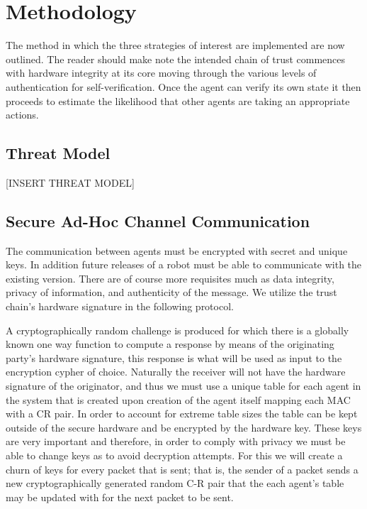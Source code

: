 \documentclass[conference]{IEEEtran}
\begin{document}
\section{Methodology}

The method in which the three strategies of interest are implemented are now outlined. The reader should make note the intended chain of trust commences with hardware integrity at its core moving through the various levels of authentication for self-verification. 
Once the agent can verify its own state it then proceeds to estimate the likelihood that other agents are taking an appropriate actions. 

\subsection{Threat Model}

[INSERT THREAT MODEL]

\subsection{Secure Ad-Hoc Channel Communication}

The communication between agents must be encrypted with secret and unique keys. In addition future releases of a robot must be able to communicate with the existing version. There are of course more requisites much as data integrity, privacy of information, and authenticity of the message. We utilize the trust chain's hardware signature in the following protocol.

A cryptographically random challenge is produced for which there is a globally known one way function to compute a response by means of the originating party's hardware signature, this response is what will be used as input to the encryption cypher of choice. Naturally the receiver will not have the hardware signature of the originator, and thus we must use a unique table for each agent in the system that is created upon creation of the agent itself mapping each MAC with a CR pair. In order to account for extreme table sizes the table can be kept outside of the secure hardware and be encrypted by the hardware key. These keys are very important and therefore, in order to comply with privacy we must be able to change keys as to avoid decryption attempts. For this we will create a churn of keys for every packet that is sent; that is, the sender of a packet sends a new cryptographically generated random C-R pair that the each agent's table may be updated with for the next packet to be sent.
	
\end{document}
